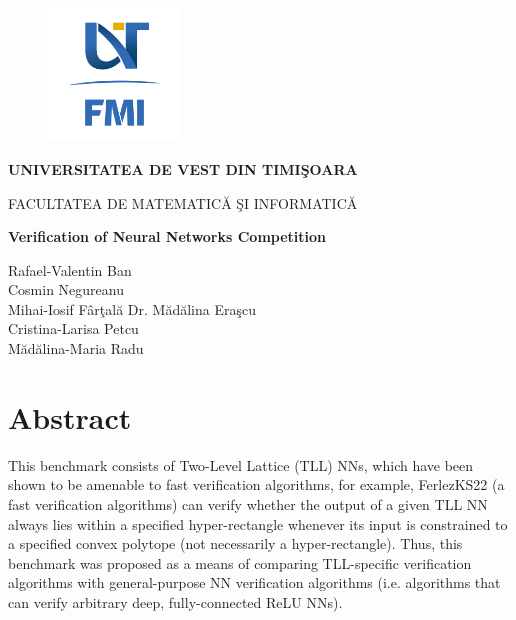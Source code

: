 \documentclass[12pt,a4paper]{report}
\theoremstyle{definition}
\theoremstyle{remark}
\begin{document}
\thispagestyle{empty}
\begin{center}
\begin{figure}[h!]
\vspace{-20pt}
\begin{center}
\includegraphics[width=100pt]{FMI-03.png}
\end{center}
\end{figure}

{\large{\bf UNIVERSITATEA DE VEST DIN TIMI\c SOARA

FACULTATEA DE MATEMATIC\u A \c SI INFORMATIC\u A}}

\vspace{65pt}
{\huge {\bf Verification of Neural Networks Competition}}

\vspace{65pt}
\end{center}

\noindent Rafael-Valentin Ban\\
\noindent Cosmin Negureanu\\
\noindent Mihai-Iosif F\^{a}r\c tal\u a \hfill Dr. M\u ad\u alina Era\c scu\\
\noindent Cristina-Larisa Petcu\\
\noindent M\u ad\u alina-Maria Radu\\

\vspace{65pt}
\section*{Abstract}
This benchmark consists of Two-Level Lattice (TLL) NNs, which have been shown to be amenable to fast verification algorithms, for example, FerlezKS22\cite{tll_fast_algorithm} (a fast verification algorithms) can verify whether the output of a given TLL NN always lies within a specified hyper-rectangle whenever its input is constrained to a specified convex polytope (not necessarily a hyper-rectangle).\cite{tll_fast_algorithm} Thus, this benchmark was proposed as a means of comparing TLL-specific verification algorithms with general-purpose NN verification algorithms (i.e. algorithms that can verify arbitrary deep, fully-connected ReLU NNs).\cite{tll_git}
\end{document}
